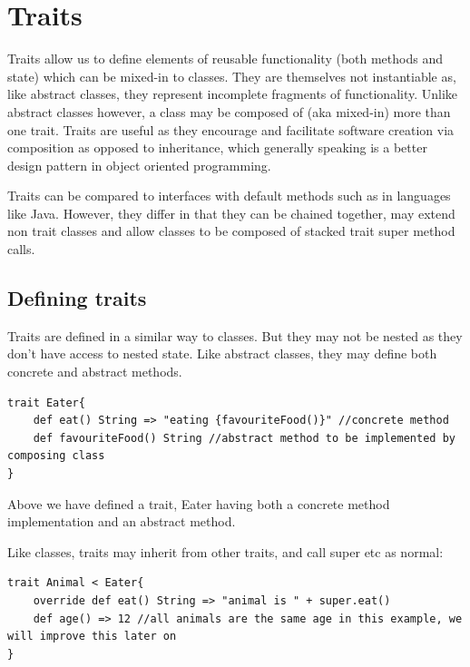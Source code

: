 \documentclass[conc-doc]{subfiles}
\begin{document}
	
	\chapter[Traits]{Traits}
	\label{ch:traits}



Traits allow us to define elements of reusable functionality (both methods and state) which can be mixed-in to classes. They are themselves not instantiable as, like abstract classes, they represent incomplete fragments of functionality. Unlike abstract classes however, a class may be composed of (aka mixed-in) more than one trait. Traits are useful as they encourage and facilitate software creation via composition as opposed to inheritance, which generally speaking is a better design pattern in object oriented programming.

Traits can be compared to interfaces with default methods such as in languages like Java. However, they differ in that they can be chained together, may extend non trait classes and allow classes to be composed of stacked trait super method calls.

\section{Defining traits}
Traits are defined in a similar way to classes. But they may not be nested as they don't have access to nested state. Like abstract classes, they may define both concrete and abstract methods.
\begin{lstlisting}
trait Eater{
	def eat() String => "eating {favouriteFood()}" //concrete method
	def favouriteFood() String //abstract method to be implemented by composing class
}
\end{lstlisting}

Above we have defined a trait, Eater having both a concrete method implementation and an abstract method.

Like classes, traits may inherit from other traits, and call super etc as normal:
\begin{lstlisting}
trait Animal < Eater{
	override def eat() String => "animal is " + super.eat()
	def age() => 12 //all animals are the same age in this example, we will improve this later on
}
\end{lstlisting}
\end{document}
